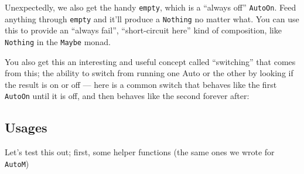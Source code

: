 \documentclass[]{article}
\newenvironment{Shaded}{}{}
\newcommand{\CommentTok}[1]{\textcolor[rgb]{0.38,0.63,0.69}{\textit{#1}}}
\newcommand{\DataTypeTok}[1]{\textcolor[rgb]{0.56,0.13,0.00}{#1}}
\newcommand{\DecValTok}[1]{\textcolor[rgb]{0.25,0.63,0.44}{#1}}
\newcommand{\KeywordTok}[1]{\textcolor[rgb]{0.00,0.44,0.13}{\textbf{#1}}}
\newcommand{\NormalTok}[1]{#1}
\newcommand{\OperatorTok}[1]{\textcolor[rgb]{0.40,0.40,0.40}{#1}}
\newcommand{\OtherTok}[1]{\textcolor[rgb]{0.00,0.44,0.13}{#1}}
\begin{document}
Unexpectedly, we also get the handy \texttt{empty}, which is a ``always off''
\texttt{AutoOn}. Feed anything through \texttt{empty} and it'll produce a
\texttt{Nothing} no matter what. You can use this to provide an ``always fail'',
``short-circuit here'' kind of composition, like \texttt{Nothing} in the
\texttt{Maybe} monad.

You also get this an interesting and useful concept called ``switching'' that
comes from this; the ability to switch from running one Auto or the other by
looking if the result is on or off --- here is a common switch that behaves like
the first \texttt{AutoOn} until it is off, and then behaves like the second
forever after:

\begin{Shaded}
\end{Shaded}

\subsection{Usages}\label{usages}

Let's test this out; first, some helper functions (the same ones we wrote for
\texttt{AutoM})
\end{document}
